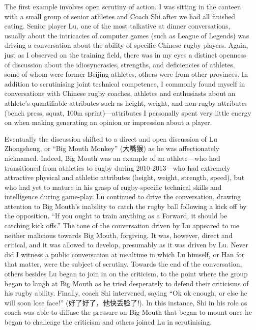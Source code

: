 \begin{CJK}{UTF8}{gbsn}
  The first example involves open scrutiny of action. I was sitting in the canteen with a small group of senior athletes and Coach Shi after we had all finished eating.  Senior player Lu, one of the most talkative at dinner conversations, usually about the intricacies of computer games (such as League of Legends) was driving a conversation about the ability of specific Chinese rugby players. Again, just as I observed on the training field, there was in my eyes a distinct openness of discussion about the idiosyncrasies, strengths, and deficiencies of athletes, some of whom were former Beijing athletes, others were from other provinces.  In addition to scrutinising joint technical competence, I commonly found myself in conversations with Chinese rugby coaches, athletes and enthusiasts about an athlete's quantifiable attributes such as height, weight, and non-rugby attributes (bench press, squat, 100m sprint)---attributes I personally spent very little energy on when making generating an opinion or impression about a player.

  Eventually the discussion shifted to a direct and open discussion of Lu Zhongsheng, or ``Big Mouth Monkey'' (大嘴猴) as he was affectionately nicknamed. Indeed, Big Mouth was an example of an athlete---who had transitioned from athletics to rugby during 2010-2013---who had extremely attractive physical and athletic attributes (height, weight, strength, speed), but who had yet to mature in his grasp of rugby-specific technical skills and intelligence during game-play.  Lu continued to drive the conversation, drawing attention to Big Mouth's inability to catch the rugby ball following a kick off by the opposition. ``If you ought to train anything as a Forward, it should be catching kick offs.'' The tone of the conversation driven by Lu appeared to me neither malicious towards Big Mouth, forgiving. It was, however, direct and critical, and it was allowed to develop, presumably as it was driven by Lu.  Never did I witness a public conversation at mealtime in which Lu himself, or Han for that matter, were the subject of scrutiny. Towards the end of the conversation, others besides Lu began to join in on the criticism, to the point where the group began to laugh at Big Mouth as he tried desperately to defend their criticisms of his rugby ability.
  Finally, coach Shi intervened, saying ``Ok ok enough, or else he will soon lose face!'' (好了好了，他快丢脸了!).  In this instance, Shi in his role as coach was able to diffuse the pressure on Big Mouth that began to mount once he began to challenge the criticism and others joined Lu in scrutinising.


\end{CJK}
